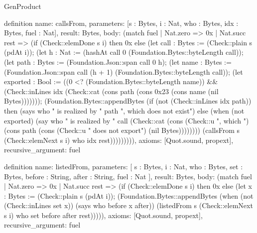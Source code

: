 \begin{lexlean}{GenProduct}
\begin{semanticmodule}
{definition{
  name: callsFrom,
  parameters: [s : Bytes, i : Nat, who : Bytes, idx : Bytes, fuel : Nat],
  result: Bytes,
  body: (match fuel
    | Nat.zero => 0x
    | Nat.succ rest => (if (Check::elemDone s i) then 0x else (let call : Bytes := (Check::plain s (pdAt i)); (let h : Nat := (hashAt call 0 (Foundation.Bytes::byteLength call)); (let path : Bytes := (Foundation.Json::span call 0 h); (let name : Bytes := (Foundation.Json::span call (h + 1) (Foundation.Bytes::byteLength call)); (let exported : Bool := ((0 <? (Foundation.Bytes::byteLength name)) && (Check::inLines idx (Check::cat (cons path (cons 0x23 (cons name (nil Bytes))))))); (Foundation.Bytes::appendBytes (if (not (Check::inLines idx path)) then (says who " is realized by " path ", which does not exist") else (when (not exported) (say who " is realized by " call (Check::cat (cons (Check::u ", which ") (cons path (cons (Check::u " does not export") (nil Bytes)))))))) (callsFrom s (Check::elemNext s i) who idx rest))))))))),
  axioms: [Quot.sound, propext],
  recursive_argument: fuel
}

definition{
  name: listedFrom,
  parameters: [
    s : Bytes,
    i : Nat,
    who : Bytes,
    set : Bytes,
    before : String,
    after : String,
    fuel : Nat
  ],
  result: Bytes,
  body: (match fuel
    | Nat.zero => 0x
    | Nat.succ rest => (if (Check::elemDone s i) then 0x else (let x : Bytes := (Check::plain s (pdAt i)); (Foundation.Bytes::appendBytes (when (not (Check::inLines set x)) (says who before x after)) (listedFrom s (Check::elemNext s i) who set before after rest))))),
  axioms: [Quot.sound, propext],
  recursive_argument: fuel
}

}
\end{semanticmodule}
\end{lexlean}
